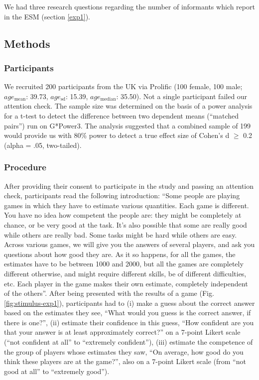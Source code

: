 \documentclass[
  doc,floatsintext]{apa6}
\begin{document}
We had three research questions regarding the number of informants which report in the ESM (section \ref{exp1}).

\subsection{Methods}\label{methods}

\subsubsection{Participants}\label{participants}

We recruited 200 participants from the UK via Prolific (100 female, 100 male; \(age_\text{mean}\): 39.73, \(age_\text{sd}\): 15.39, \(age_\text{median}\): 35.50). Not a single participant failed our attention check. The sample size was determined on the basis of a power analysis for a t-test to detect the difference between two dependent means (``matched pairs'') run on G*Power3. The analysis suggested that a combined sample of 199 would provide us with 80\% power to detect a true effect size of Cohen's d \(\geq\) 0.2 (alpha = .05, two-tailed).

\subsubsection{Procedure}\label{procedure}

After providing their consent to participate in the study and passing an attention check, participants read the following introduction: ``Some people are playing games in which they have to estimate various quantities. Each game is different. You have no idea how competent the people are: they might be completely at chance, or be very good at the task. It's also possible that some are really good while others are really bad. Some tasks might be hard while others are easy. Across various games, we will give you the answers of several players, and ask you questions about how good they are. As it so happens, for all the games, the estimates have to be between 1000 and 2000, but all the games are completely different otherwise, and might require different skills, be of different difficulties, etc. Each player in the game makes their own estimate, completely independent of the others''. After being presented with the results of a game (Fig. \ref{fig:stimulus-exp1}), participants had to (i) make a guess about the correct answer based on the estimates they see, ``What would you guess is the correct answer, if there is one?'', (ii) estimate their confidence in this guess, ``How confident are you that your answer is at least approximately correct?'' on a 7-point Likert scale (``not confident at all'' to ``extremely confident''), (iii) estimate the competence of the group of players whose estimates they saw, ``On average, how good do you think these players are at the game?'', also on a 7-point Likert scale (from ``not good at all'' to ``extremely good'').
\end{document}
